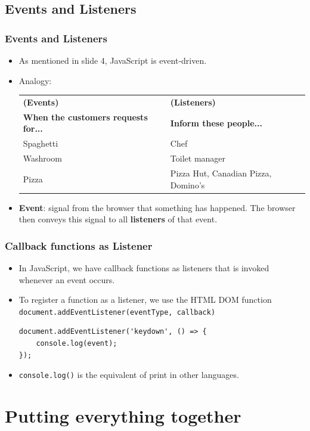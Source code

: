 \documentclass[handout,12pt]{beamer}
\begin{document}
\subsection{Events and Listeners}
\begin{frame}[fragile]
	\frametitle{Events and Listeners}
	\begin{itemize}
		\item As mentioned in slide 4, JavaScript is event-driven.
		\item Analogy:
		\begin{tabularx}{\linewidth}{|X|X|}
			\hline
			\textbf{(Events)} & \textbf{(Listeners)} \\
			\textbf{When the customers requests for...}		&  \textbf{Inform these people...} \\ \hline
			Spaghetti		& Chef \\ \hline
			Washroom		& Toilet manager \\ \hline
			Pizza				& Pizza Hut, Canadian Pizza, Domino's \\ \hline
		\end{tabularx}
		\item \textbf{Event}: signal from the browser that something has happened. The browser then conveys this signal to all \textbf{listeners} of that event.
	\end{itemize}
\end{frame}
\begin{frame}[fragile]
	\frametitle{Callback functions as Listener}
	\begin{itemize}
		\item In JavaScript, we have callback functions as listeners that is invoked whenever an event occurs.
		\item To register a function as a listener, we use the HTML DOM function \texttt{document.addEventListener(eventType, callback)}\footnotemark
			\begin{verbatim}
document.addEventListener('keydown', () => {
	console.log(event);
});
			\end{verbatim}
		\item \texttt{console.log()} is the equivalent of print in other languages.
	\end{itemize}
\end{frame}

\section{Putting everything together}
\end{document}
